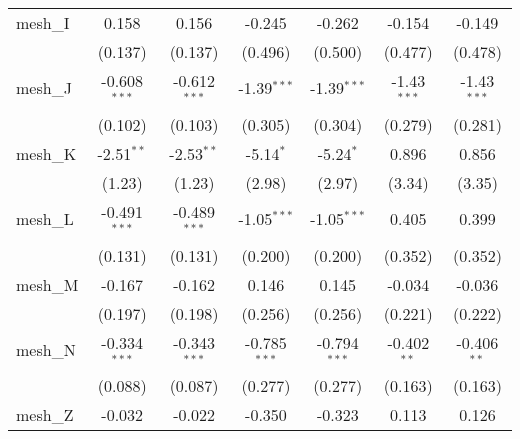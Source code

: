 \begin{tabular}{lcccccc}
   mesh\_I                                                     & 0.158          & 0.156          & -0.245         & -0.262         & -0.154         & -0.149\\   
                                                               & (0.137)        & (0.137)        & (0.496)        & (0.500)        & (0.477)        & (0.478)\\   
   mesh\_J                                                     & -0.608$^{***}$ & -0.612$^{***}$ & -1.39$^{***}$  & -1.39$^{***}$  & -1.43$^{***}$  & -1.43$^{***}$\\   
                                                               & (0.102)        & (0.103)        & (0.305)        & (0.304)        & (0.279)        & (0.281)\\   
   mesh\_K                                                     & -2.51$^{**}$   & -2.53$^{**}$   & -5.14$^{*}$    & -5.24$^{*}$    & 0.896          & 0.856\\   
                                                               & (1.23)         & (1.23)         & (2.98)         & (2.97)         & (3.34)         & (3.35)\\   
   mesh\_L                                                     & -0.491$^{***}$ & -0.489$^{***}$ & -1.05$^{***}$  & -1.05$^{***}$  & 0.405          & 0.399\\   
                                                               & (0.131)        & (0.131)        & (0.200)        & (0.200)        & (0.352)        & (0.352)\\   
   mesh\_M                                                     & -0.167         & -0.162         & 0.146          & 0.145          & -0.034         & -0.036\\   
                                                               & (0.197)        & (0.198)        & (0.256)        & (0.256)        & (0.221)        & (0.222)\\   
   mesh\_N                                                     & -0.334$^{***}$ & -0.343$^{***}$ & -0.785$^{***}$ & -0.794$^{***}$ & -0.402$^{**}$  & -0.406$^{**}$\\   
                                                               & (0.088)        & (0.087)        & (0.277)        & (0.277)        & (0.163)        & (0.163)\\   
   mesh\_Z                                                     & -0.032         & -0.022         & -0.350         & -0.323         & 0.113          & 0.126\\   

\end{tabular}
